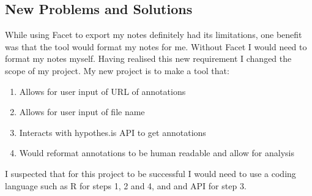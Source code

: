 \documentclass{article}
\begin{document}
\subsection{New Problems and Solutions}
While using Facet to export my notes definitely had its limitations, one benefit was that the tool would format my notes for me. Without Facet I would need to format my notes myself. Having realised this new requirement I changed the scope of my project. My new project is to make a tool that:
\begin{enumerate}
\item Allows for user input of URL of annotations
\item Allows for user input of file name
\item Interacts with hypothes.is API to get annotations
\item Would reformat annotations to be human readable and allow for analysis
\end{enumerate}
I suspected that for this project to be successful I would need to use a coding language such as R for steps 1, 2 and 4, and and API for step 3. 
\end{document}
